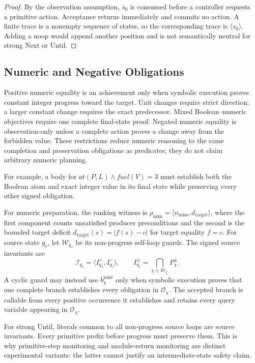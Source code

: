 \begin{proof}
By the observation assumption, $s_0$ is consumed before a controller requests a
primitive action. Acceptance returns immediately and commits no action. A finite
trace is a nonempty sequence of states, so the corresponding trace is
$\langle s_0\rangle$. Adding a noop would append another position and is not
semantically neutral for strong Next or Until.
\end{proof}

\subsection{Numeric and Negative Obligations}

Positive numeric equality is an achievement only when symbolic execution proves
constant integer progress toward the target. Unit changes require strict
direction; a larger constant change requires the exact predecessor. Mixed
Boolean--numeric objectives require one complete final-state proof. Negated
numeric equality is observation-only unless a complete action proves a change
away from the forbidden value. These restrictions reduce numeric reasoning to
the same completion and preservation obligations as predicates; they do not
claim arbitrary numeric planning.

For example, a body for
$\mathit{at}(P,L)\land\mathit{fuel}(V)=3$ must establish both the Boolean atom
and exact integer value in its final state while preserving every other signed
obligation.

For numeric preparation, the ranking witness is
$\rho_{\mathrm{num}}=\langle n_{\mathrm{miss}},d_{\mathrm{target}}\rangle$,
where the first component counts unsatisfied producer preconditions and the
second is the bounded target deficit
$d_{\mathrm{target}}(s)=|f(s)-c|$ for target equality $f=c$. For source state
$q_s$, let $\mathcal W_{q_s}$ be its non-progress self-loop guards. The signed
source invariants are
\[
\mathcal I_{q_s}=\langle I_{q_s}^+,I_{q_s}^-\rangle,
\qquad I_{q_s}^{\pm}=\bigcap_{\chi\in\mathcal W_{q_s}}P_\chi^{\pm}.
\]
A cyclic
guard may instead use $b_\chi^{\mathrm{joint}}$ only when symbolic execution
proves that one complete branch establishes every obligation in
$\mathcal O_\chi$. The accepted branch is callable from every positive
occurrence it establishes and retains every query variable appearing in
$\mathcal O_\chi$.

For strong Until, literals common to all non-progress source loops are source
invariants. Every primitive prefix before progress must preserve them. This is
why primitive-step monitoring and module-return monitoring are distinct
experimental variants: the latter cannot justify an intermediate-state safety
claim.

